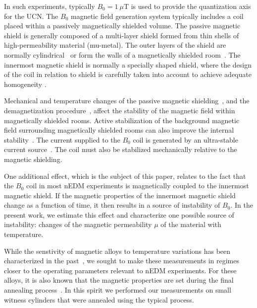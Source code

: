 \documentclass[review,number,sort&compress]{elsarticle}
\begin{document}
In such experiments, typically $B_0=1~\mu$T is used to provide the
quantization axis for the UCN.  The $B_0$ magnetic field generation
system typically includes a coil placed within a passively
magnetically shielded volume.  The passive magnetic shield is
generally composed of a multi-layer shield formed from thin shells of
high-permeability material (mu-metal).  The outer layers of the shield
are normally cylindrical~\cite{bib:nedm2,bib:nedm3.5} or form the
walls of a magnetically shielded
room~\cite{bib:altarev2014,bib:altarev2015}.  The innermost magnetic
shield is normally a specially shaped shield, where the design of the
coil in relation to shield is carefully taken into account to achieve
adequate homogeneity \cite{bib:baker,bib:nedm3,bib:nedm5}.

Mechanical and temperature changes of the passive magnetic
shielding~\cite{bib:voigt,bib:thiel}, and the demagnetization
procedure~\cite{bib:thiel,bib:altarev2015,bib:fierlinger2016}, affect
the stability of the magnetic field within magnetically shielded
rooms.  Active stabilization of the background magnetic field
surrounding magnetically shielded rooms can also improve the internal
stability~\cite{bib:voigt,bib:afach,bib:franke}.  The current supplied
to the $B_0$ coil is generated by an ultra-stable current
source~\cite{bib:brys}. The coil must also be stabilized mechanically
relative to the magnetic shielding.

One additional effect, which is the subject of this paper, relates to
the fact that the $B_0$ coil in most nEDM experiments is magnetically
coupled to the innermost magnetic shield.  If the magnetic properties
of the innermost magnetic shield change as a function of time, it then
results in a source of instability of $B_0$.  In the present work, we
estimate this effect and characterize one possible source of
instability: changes of the magnetic permeability $\mu$ of the
material with temperature.

While the senstivity of magnetic alloys to temperature variations has
been characterized in the past~\cite{bib:couderchon,bib:kruppvdm}, we
sought to make these measurements in regimes closer to the operating
parameters relevant to nEDM experiments.  For these alloys, it is also
known that the magnetic properties are set during the final annealing
process~\cite{bib:gupta,bib:bozorth,bib:kruppvdm}.  In this spirit we
performed our measurements on small witness cylinders that were
annealed using the typical process.
\end{document}
